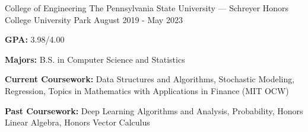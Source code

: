 
\begin{cventries}
  \cventry
    {College of Engineering} %
    {The Pennsylvania State University --- Schreyer Honors College} %
    {University Park} %
    {August 2019 - May 2023} %
    {
    \begin{cvitems} %
        \item {\textbf{GPA:} 3.98/4.00}
         \item {\textbf{Majors:} B.S. in Computer Science and Statistics}
         \item {\textbf{Current Coursework:} Data Structures and Algorithms, Stochastic Modeling, Regression, Topics in Mathematics with Applications in Finance (MIT OCW)}
         \item {\textbf{Past Coursework:} Deep Learning Algorithms and Analysis, Probability, Honors Linear Algebra, Honors Vector Calculus}
      \end{cvitems}
    }
\end{cventries}
